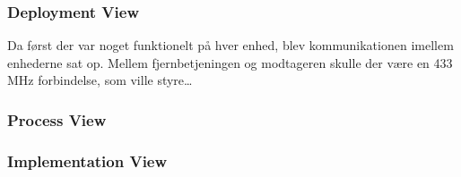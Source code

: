 \documentclass[Main]{subfiles}
\begin{document}
\subsubsection*{Deployment View}
Da først der var noget funktionelt på hver enhed, blev kommunikationen imellem enhederne sat op.
Mellem fjernbetjeningen og modtageren skulle der være en 433 MHz forbindelse, som ville styre\dots{}

\subsubsection*{Process View}


\subsubsection*{Implementation View}
\end{document}
